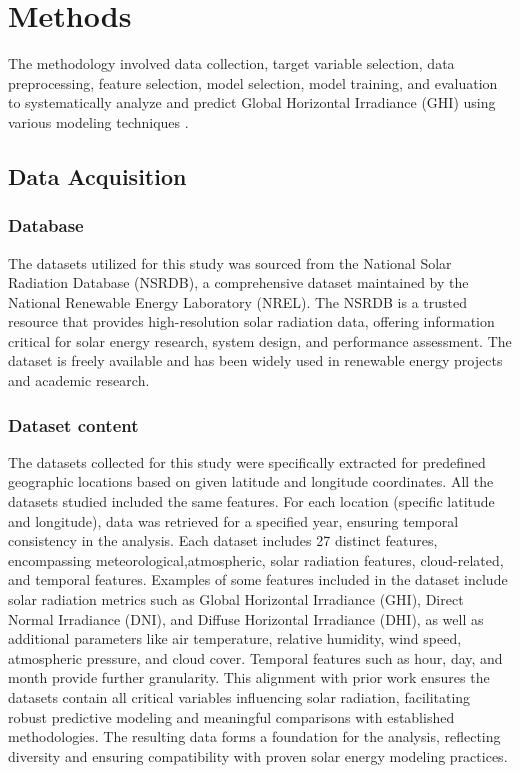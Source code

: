 \documentclass[10pt,twocolumn]{article}
\begin{document}





\section{Methods}

The methodology involved data collection, target variable selection, data preprocessing, feature selection, model selection, model training, and evaluation to systematically analyze and predict Global Horizontal Irradiance (GHI) using various modeling techniques . 

\subsection{Data Acquisition} 
\subsubsection{Database}
The datasets utilized for this study was sourced from the National Solar Radiation Database (NSRDB), a comprehensive dataset maintained by the National Renewable Energy Laboratory (NREL). The NSRDB is a trusted resource that provides high-resolution solar radiation data, offering information critical for solar energy research, system design, and performance assessment. The dataset is freely available and has been widely used in renewable energy projects and academic research.
\subsubsection{Dataset content}
The datasets collected for this study were specifically extracted for predefined geographic locations based on given latitude and longitude coordinates. All the datasets studied included the same features. For each location (specific latitude and longitude), data was retrieved for a specified year, ensuring temporal consistency in the analysis. Each dataset includes 27 distinct features, encompassing meteorological,atmospheric, solar radiation features, cloud-related, and temporal features. Examples of some features included in the dataset include solar radiation metrics such as Global Horizontal Irradiance (GHI), Direct Normal Irradiance (DNI), and Diffuse Horizontal Irradiance (DHI), as well as additional parameters like air temperature, relative humidity, wind speed, atmospheric pressure, and cloud cover. Temporal features such as hour, day, and month provide further granularity.
This alignment with prior work ensures the datasets contain all critical variables influencing solar radiation, facilitating robust predictive modeling and meaningful comparisons with established methodologies. The resulting data forms a foundation for the analysis, reflecting diversity and ensuring compatibility with proven solar energy modeling practices.
\end{document}
